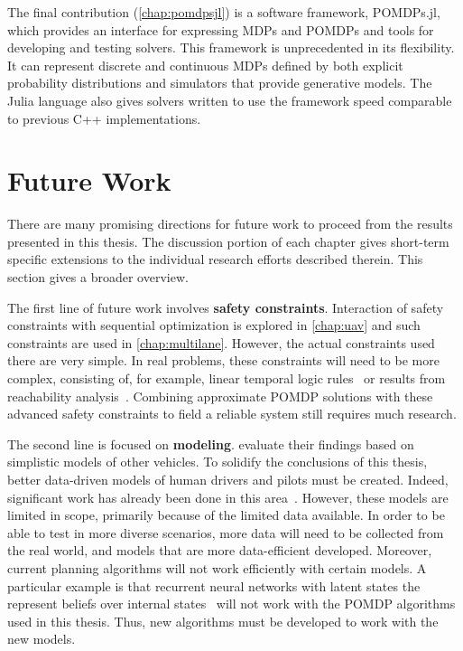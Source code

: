 The final contribution (\cref{chap:pomdpsjl}) is a software framework, POMDPs.jl, which provides an interface for expressing MDPs and POMDPs and tools for developing and testing solvers.
This framework is unprecedented in its flexibility.
It can represent discrete and continuous MDPs defined by both explicit probability distributions and simulators that provide generative models.
The Julia language also gives solvers written to use the framework speed comparable to previous C++ implementations.

\section{Future Work}

There are many promising directions for future work to proceed from the results presented in this thesis.
The discussion portion of each chapter gives short-term specific extensions to the individual research efforts described therein.
This section gives a broader overview.

The first line of future work involves \textbf{safety constraints}.
Interaction of safety constraints with sequential optimization is explored in \cref{chap:uav} and such constraints are used in \cref{chap:multilane}.
However, the actual constraints used there are very simple.
In real problems, these constraints will need to be more complex, consisting of, for example, linear temporal logic rules~\cite{sadigh2016safe} or results from reachability analysis~\cite{chen2015exact}.
Combining approximate POMDP solutions with these advanced safety constraints to field a reliable system still requires much research.

The second line is focused on \textbf{modeling}.  evaluate their findings based on simplistic models of other vehicles.
To solidify the conclusions of this thesis, better data-driven models of human drivers and pilots must be created.
Indeed, significant work has already been done in this area~\cite{schmerling2018multimodal,bhattacharyya2018multi}. 
However, these models are limited in scope, primarily because of the limited data available.
In order to be able to test in more diverse scenarios, more data will need to be collected from the real world, and models that are more data-efficient developed.
Moreover, current planning algorithms will not work efficiently with certain models.
A particular example is that recurrent neural networks with latent states the represent beliefs over internal states~\cite{schmerling2018multimodal} will not work with the POMDP algorithms used in this thesis.
Thus, new algorithms must be developed to work with the new models.

